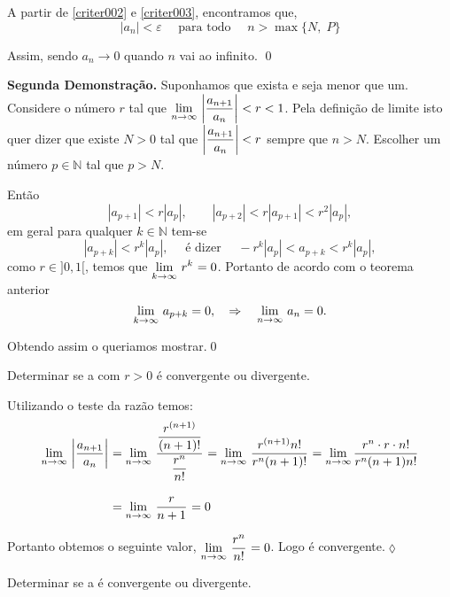 A partir de \eqref{criter002} e \eqref{criter003}, encontramos que,
\begin{equation*}
    |a_n|<\varepsilon\quad \text{ para todo }\quad n>\max\{N,\; P\}
\end{equation*}

Assim, sendo $a_n\to 0$ quando $n$ vai ao infinito. \qed

\textbf{Segunda Demonstra\c{c}\~{a}o.} Suponhamos que  exista e seja menor que um. Considere o n\'{u}mero $r$ tal
que $\displaystyle{\lim_{n\to \infty}\,{\left|\frac{a_{n+1}}{a_{n}} \right|}_{}}<r<1$. Pela
defini\c{c}\~{a}o de limite isto quer dizer que existe $N>0$ tal que
$\displaystyle{\left|\frac{a_{n+1}}{a_{n}}\right|}<r$ sempre que $n>N$.
Escolher um n\'{u}mero $p\in \mathbb{N}$ tal que $p>N$.

Ent\~{a}o
\begin{equation*}
 |a_{p+1}|<r|a_{p}|,\qquad |a_{p+2}|<r|a_{p+1}|<r^2|a_p|,
\end{equation*}
em geral para qualquer $k\in \mathbb{N}$ tem-se
\begin{equation*}
 |a_{p+k}|<r^k|a_{p}|,\quad \text{ \'{e} dizer }\quad
-r^k|a_{p}|<a_{p+k}<r^k|a_p|,
\end{equation*}
como $r\in]0,1[$, temos que $\displaystyle{\lim_{k\to \infty}\,{r^k}_{}}=0$. Portanto de
acordo com o teorema anterior
\begin{equation*}
  \displaystyle{\lim_{k\to \infty}\,{a}_{p+k}}=0,\quad \Rightarrow \quad \displaystyle{\lim_{n\to \infty}\,{a}_{n}}=0.
\end{equation*}

Obtendo assim o queriamos mostrar.\qed

\begin{exer}
Determinar se a \seq {} com $r>0$ \'{e} convergente ou
divergente.
\end{exer}

\solo Utilizando o teste da raz\~{a}o temos:
\begin{align*}
  \displaystyle{\lim_{n\to \infty}\,{\left|\frac{a_{n+1}}{a_n}\right|}_{}}&=\displaystyle{\lim_{n\to \infty}\,{\frac{\displaystyle{\frac{r^{(n+1)}}{(n+1)!}}}
  {\displaystyle{\dfrac{r^n}{n!}}}}_{}}=\displaystyle{\lim_{n\to \infty}\,{\frac{r^{(n+1)}n!}{r^n(n+1)!}}_{}} = 
  \lim_{n\to \infty}\dfrac{r^{n}\cdot r \cdot n!}{r^{n}(n+1)n!}\\[2ex]
    &=\displaystyle{\lim_{n\to \infty}\,{\frac{r}{n+1}}_{}}=0
\end{align*}

Portanto obtemos o seguinte valor,
$\displaystyle{\lim_{n\to \infty}\,{\frac{r^n}{n!}}_{}}=0$. Logo \'{e} convergente.\hfill \(\lozenge\)

\begin{exer}
Determinar se a \seq {} \'{e} convergente ou
divergente.
\end{exer}

